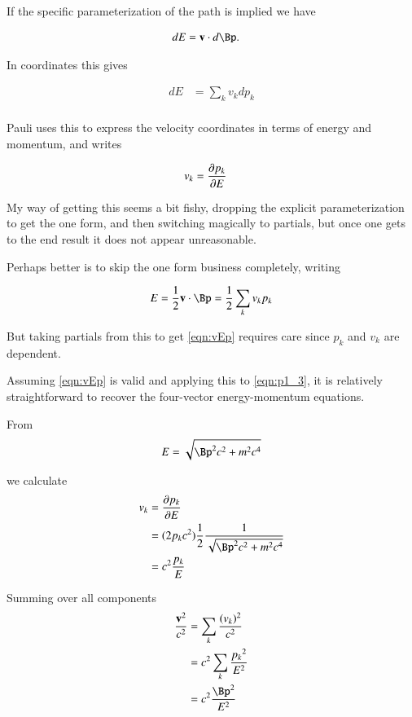 \documentclass{article}
\begin{document}
If the specific parameterization of the path is implied we have

\begin{align}\label{eqn:EvP}
{dE} &= \Bv \cdot {d\Bp}.
\end{align}

In coordinates this gives

\begin{align*}
{dE} &= \sum_k v_k dp_k \\
\end{align*}

Pauli uses this to express the velocity coordinates in terms of energy and momentum, and writes

\begin{align}\label{eqn:vEp}
v_k &= \frac{\partial{p_k}}{\partial {E}}
\end{align}

My way of getting this seems a bit fishy, dropping the explicit parameterization to get the one form, and then switching magically to partials, but once one gets to the end result it does not appear unreasonable.

Perhaps better is to skip the one form business completely, writing

\begin{align*}
E = \inv{2} \Bv \cdot \Bp = \inv{2} \sum_k v_k p_k
\end{align*}

But taking partials from this to get \ref{eqn:vEp} requires care since $p_k$ and $v_k$ are dependent.

Assuming \ref{eqn:vEp} is valid and applying this to \ref{eqn:p1_3}, it is relatively straightforward to
recover the four-vector energy-momentum equations.  

From
\begin{align*}
E &= \sqrt{\Bp^2 c^2 + m^2 c^4 } \\
\end{align*}

we calculate
\begin{align*}
v_k 
&= \PD{p_k}{E} \\
&= (2 p_k c^2) \inv{2} \frac{1}{\sqrt{\Bp^2 c^2 + m^2 c^4 }} \\
&= c^2 \frac{p_k}{E}
\end{align*}

Summing over all components
\begin{align*}
\frac{\Bv^2}{c^2} 
&= \sum_k \frac{(v_k)^2}{c^2} \\
&= c^2 \sum_k \frac{{p_k}^2}{E^2} \\
&= c^2 \frac{\Bp^2}{E^2} \\
\end{align*}
\end{document}
